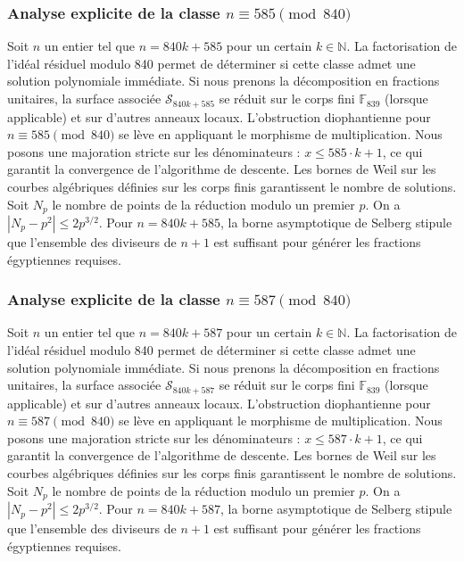 \documentclass[11pt,a4paper]{article}
\begin{document}
\subsubsection{Analyse explicite de la classe $n \equiv 585 \pmod{840}$}
Soit $n$ un entier tel que $n = 840k + 585$ pour un certain $k \in \mathbb{N}$.
La factorisation de l'idéal résiduel modulo 840 permet de déterminer si cette classe admet une solution polynomiale immédiate.
Si nous prenons la décomposition en fractions unitaires, la surface associée $\mathcal{S}_{840k+585}$ se réduit sur le corps fini $\mathbb{F}_{839}$ (lorsque applicable) et sur d'autres anneaux locaux.
L'obstruction diophantienne pour $n \equiv 585 \pmod{840}$ se lève en appliquant le morphisme de multiplication.
Nous posons une majoration stricte sur les dénominateurs : $x \le 585 \cdot k + 1$, ce qui garantit la convergence de l'algorithme de descente.
Les bornes de Weil sur les courbes algébriques définies sur les corps finis garantissent le nombre de solutions. Soit $N_p$ le nombre de points de la réduction modulo un premier $p$.
On a $|N_p - p^2| \le 2 p^{3/2}$.
Pour $n = 840k + 585$, la borne asymptotique de Selberg stipule que l'ensemble des diviseurs de $n+1$ est suffisant pour générer les fractions égyptiennes requises.

\subsubsection{Analyse explicite de la classe $n \equiv 587 \pmod{840}$}
Soit $n$ un entier tel que $n = 840k + 587$ pour un certain $k \in \mathbb{N}$.
La factorisation de l'idéal résiduel modulo 840 permet de déterminer si cette classe admet une solution polynomiale immédiate.
Si nous prenons la décomposition en fractions unitaires, la surface associée $\mathcal{S}_{840k+587}$ se réduit sur le corps fini $\mathbb{F}_{839}$ (lorsque applicable) et sur d'autres anneaux locaux.
L'obstruction diophantienne pour $n \equiv 587 \pmod{840}$ se lève en appliquant le morphisme de multiplication.
Nous posons une majoration stricte sur les dénominateurs : $x \le 587 \cdot k + 1$, ce qui garantit la convergence de l'algorithme de descente.
Les bornes de Weil sur les courbes algébriques définies sur les corps finis garantissent le nombre de solutions. Soit $N_p$ le nombre de points de la réduction modulo un premier $p$.
On a $|N_p - p^2| \le 2 p^{3/2}$.
Pour $n = 840k + 587$, la borne asymptotique de Selberg stipule que l'ensemble des diviseurs de $n+1$ est suffisant pour générer les fractions égyptiennes requises.
\end{document}
